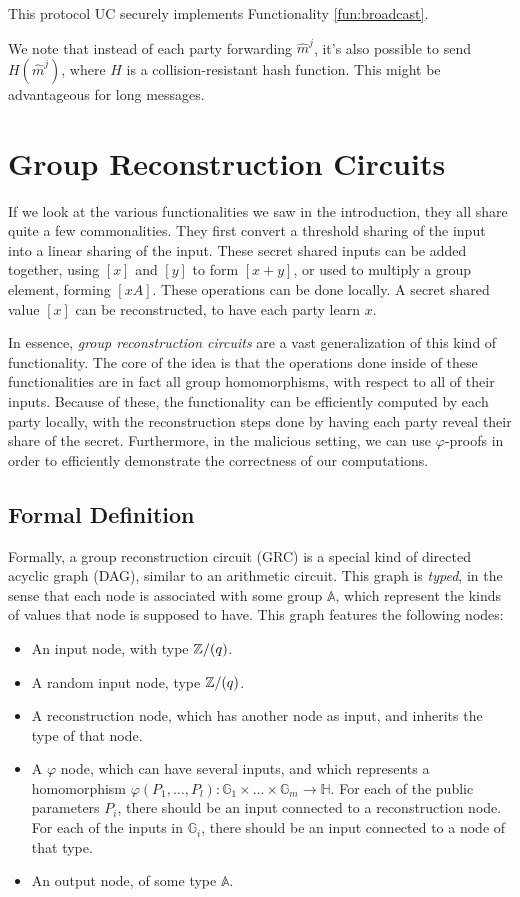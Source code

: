 This protocol UC securely implements Functionality \ref{fun:broadcast}.

We note that instead of each party forwarding $\hat{m}^j$, it's also possible
to send $H(\hat{m}^j)$, where $H$ is a collision-resistant hash function.
This might be advantageous for long messages.

\section{Group Reconstruction Circuits}

If we look at the various functionalities we saw in the introduction,
they all share quite a few commonalities. They first convert
a threshold sharing of the input into a linear sharing of the input.
These secret shared inputs can be added together, using $[x]$ and $[y]$
to form $[x + y]$, or used to multiply a group element, forming
$[xA]$. These operations can be done locally.
A secret shared value $[x]$ can be reconstructed, to have each party learn $x$.

In essence, \emph{group reconstruction circuits} are a vast generalization
of this kind of functionality. The core of the idea is that the operations
done inside of these functionalities are in fact all group homomorphisms,
with respect to all of their inputs. Because of these, the functionality
can be efficiently computed by each party locally, with the reconstruction
steps done by having each party reveal their share of the secret.
Furthermore, in the malicious setting, we can use $\varphi$-proofs in
order to efficiently demonstrate the correctness of our computations.

\subsection{Formal Definition}

Formally, a group reconstruction circuit (GRC) is a special kind of
directed acyclic graph (DAG), similar to an arithmetic circuit.
This graph is \emph{typed}, in the sense that each node is associated
with some group $\mathbb{A}$, which represent the kinds of values
that node is supposed to have.
This graph features the following nodes:

\begin{itemize}
    \item An input node, with type $\mathbb{Z}/(q)$.
    \item A random input node, type $\mathbb{Z}/(q)$.
    \item A reconstruction node, which has another node as input, and inherits the type of that node.
    \item A $\varphi$ node, which can have several inputs, and which represents
    a homomorphism
    $\varphi(P_1, \ldots, P_l) : \mathbb{G}_1 \times \ldots \times \mathbb{G}_m \to \mathbb{H}$.
    For each of the public parameters $P_i$, there should be an input connected to a reconstruction node.
    For each of the inputs in $\mathbb{G}_i$, there should be an input connected to a node of that type.
    \item An output node, of some type $\mathbb{A}$.
\end{itemize}

